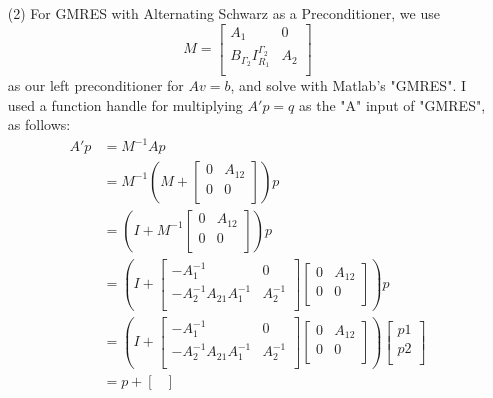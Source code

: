 \documentclass[12pt]{article}
\begin{document}
\begin{itemize}
\newpage
\item[(2)] For GMRES with Alternating Schwarz as a Preconditioner, we use
$$M = \begin{bmatrix}
A_1 & 0 \\
B_{\Gamma_2}I_{R_1}^{\Gamma_2} & A_2 \\
\end{bmatrix}$$
as our left preconditioner for $Av = b$, and solve with Matlab's "GMRES".  I used a function handle for multiplying $A'p = q$ as the "A" input of "GMRES", as follows:
\begin{align*}
A'p &= M^{-1}Ap \\
&= M^{-1}\left(M +\begin{bmatrix}
					0 & A_{12} \\
					0 & 0 \\
					\end{bmatrix}\right)p \\
&= \left(I + M^{-1} \begin{bmatrix}
					0 & A_{12} \\
					0 & 0 \\
					\end{bmatrix}\right)p \\
&= \left(I + \begin{bmatrix}
	-A_1^{-1} & 0 \\
	-A_2^{-1}A_{21}A_1^{-1} & A_2^{-1} \\
	\end{bmatrix}\begin{bmatrix}
					0 & A_{12} \\
					0 & 0 \\
					\end{bmatrix}\right)p \\
&= \left(I + \begin{bmatrix}
	-A_1^{-1} & 0 \\
	-A_2^{-1}A_{21}A_1^{-1} & A_2^{-1} \\
	\end{bmatrix}\begin{bmatrix}
					0 & A_{12} \\
					0 & 0 \\
					\end{bmatrix}\right) \begin{bmatrix}
					p1 \\
					p2 \\
					\end{bmatrix} \\
&= p + \begin{bmatrix}

\end{bmatrix}
\end{align*}
\end{itemize}
\end{document}
